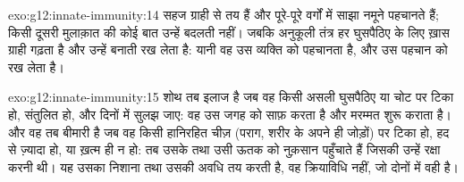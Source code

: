 \begin{solution}{exo:g12:innate-immunity:14}
सहज ग्राही  से तय हैं और पूरे-पूरे वर्गों में साझा नमूने पहचानते हैं;
किसी दूसरी मुलाक़ात की कोई बात उन्हें बदलती नहीं। जबकि अनुकूली तंत्र हर
घुसपैठिए के लिए ख़ास ग्राही गढ़ता है और उन्हें बनाती  रख लेता है:
यानी वह उस व्यक्ति को पहचानता है, और उस पहचान को रख लेता है।
\end{solution}

\begin{solution}{exo:g12:innate-immunity:15}
शोथ तब इलाज है जब वह किसी असली घुसपैठिए या चोट पर टिका हो, संतुलित हो, और
दिनों में सुलझ जाए: वह उस जगह को साफ़ करता है और मरम्मत शुरू कराता है। और वह
तब बीमारी है जब वह किसी हानिरहित चीज़ (पराग, शरीर के अपने ही जोड़ों) पर टिका
हो, हद से ज़्यादा हो, या ख़त्म ही न हो: तब उसके  तथा 
उसी ऊतक को नुक़सान पहुँचाते हैं जिसकी उन्हें रक्षा करनी थी। यह उसका निशाना
तथा उसकी अवधि तय करती है, वह क्रियाविधि नहीं, जो दोनों में वही है।
\end{solution}

